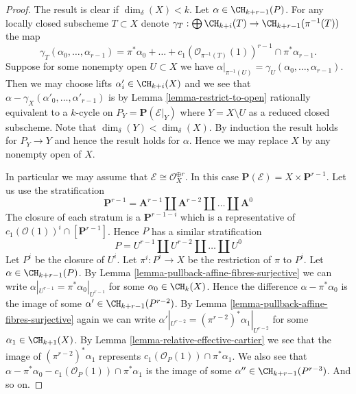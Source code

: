 \begin{proof}
\medskip\noindent
The result is clear if $\dim_\delta(X) < k$.
Let $\alpha \in \CH_{k + r - 1}(P)$.
For any locally closed subscheme $T \subset X$ denote
$\gamma_T : \bigoplus \CH_{k + i}(T) \to \CH_{k + r - 1}(\pi^{-1}(T))$
the map
$$
\gamma_T(\alpha_0, \ldots, \alpha_{r - 1})
= \pi^*\alpha_0 + \ldots +
c_1(\mathcal{O}_{\pi^{-1}(T)}(1))^{r - 1} \cap \pi^*\alpha_{r - 1}.
$$
Suppose for some nonempty open $U \subset X$ we have
$\alpha|_{\pi^{-1}(U)} = \gamma_U(\alpha_0, \ldots, \alpha_{r - 1})$.
Then we may choose lifts $\alpha'_i \in \CH_{k + i}(X)$ and we
see that $\alpha - \gamma_X(\alpha'_0, \ldots, \alpha'_{r - 1})$
is by Lemma \ref{lemma-restrict-to-open}
rationally equivalent to a $k$-cycle on $P_Y = \mathbf{P}(\mathcal{E}|_Y)$
where $Y = X \setminus U$ as a reduced closed subscheme.
Note that $\dim_\delta(Y) < \dim_\delta(X)$.
By induction the result holds
for $P_Y \to Y$ and hence the result holds for $\alpha$.
Hence we may replace $X$ by any nonempty open of $X$.

\medskip\noindent
In particular we may assume that $\mathcal{E} \cong \mathcal{O}_X^{\oplus r}$.
In this case $\mathbf{P}(\mathcal{E}) = X \times \mathbf{P}^{r - 1}$.
Let us use the stratification
$$
\mathbf{P}^{r - 1} = \mathbf{A}^{r - 1}
\amalg \mathbf{A}^{r - 2}
\amalg \ldots
\amalg \mathbf{A}^0
$$
The closure of each stratum is a $\mathbf{P}^{r - 1 - i}$ which is a
representative of $c_1(\mathcal{O}(1))^i \cap [\mathbf{P}^{r - 1}]$.
Hence $P$ has a similar stratification
$$
P = U^{r - 1} \amalg U^{r - 2} \amalg \ldots \amalg U^0
$$
Let $P^i$ be the closure of $U^i$. Let $\pi^i : P^i \to X$
be the restriction of $\pi$ to $P^i$.
Let $\alpha \in \CH_{k + r - 1}(P)$. By
Lemma \ref{lemma-pullback-affine-fibres-surjective}
we can write $\alpha|_{U^{r - 1}} = \pi^*\alpha_0|_{U^{r - 1}}$
for some $\alpha_0 \in \CH_k(X)$. Hence the difference
$\alpha - \pi^*\alpha_0$ is the image of some
$\alpha' \in \CH_{k + r - 1}(P^{r - 2})$.
By Lemma \ref{lemma-pullback-affine-fibres-surjective}
again we can write
$\alpha'|_{U^{r - 2}} = (\pi^{r - 2})^*\alpha_1|_{U^{r - 2}}$
for some $\alpha_1 \in \CH_{k + 1}(X)$.
By Lemma \ref{lemma-relative-effective-cartier}
we see that the image of $(\pi^{r - 2})^*\alpha_1$
represents $c_1(\mathcal{O}_P(1)) \cap \pi^*\alpha_1$.
We also see that
$\alpha - \pi^*\alpha_0 - c_1(\mathcal{O}_P(1)) \cap \pi^*\alpha_1$
is the image of some $\alpha'' \in \CH_{k + r - 1}(P^{r - 3})$.
And so on.
\end{proof}